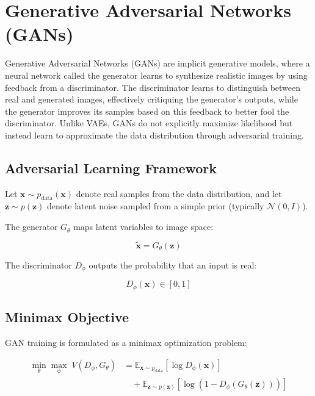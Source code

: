 \section{Generative Adversarial Networks (GANs)}
\label{sec:gan_theory}

Generative Adversarial Networks (GANs) \cite{goodfellow2014generativeadversarialnetworks} are 
implicit generative models, where a neural network called the generator learns to synthesize 
realistic images by using feedback from a discriminator. The discriminator learns to distinguish 
between real and generated images, effectively critiquing the generator’s outputs, while the 
generator improves its samples based on this feedback to better fool the discriminator. Unlike 
VAEs, GANs do not explicitly maximize likelihood but instead learn to approximate the data 
distribution through adversarial training.

\subsection{Adversarial Learning Framework}

Let $\mathbf{x} \sim p_{\text{data}}(\mathbf{x})$ denote real samples from the data distribution, and let $\mathbf{z} \sim p(\mathbf{z})$ denote latent noise sampled from a simple prior (typically $\mathcal{N}(0, I)$).

The generator $G_\theta$ maps latent variables to image space:

\begin{equation}
\tilde{\mathbf{x}} = G_\theta(\mathbf{z})
\end{equation}

The discriminator $D_\phi$ outputs the probability that an input is real:

\begin{equation}
D_\phi(\mathbf{x}) \in [0,1]
\end{equation}

\subsection{Minimax Objective}

GAN training is formulated as a minimax optimization problem:

\begin{align}
\min_\theta \max_\phi \; V(D_\phi, G_\theta)
&=
\mathbb{E}_{\mathbf{x} \sim p_{\text{data}}}
\left[
\log D_\phi(\mathbf{x})
\right]
\\
&\quad +
\mathbb{E}_{\mathbf{z} \sim p(\mathbf{z})}
\left[
\log \left(1 - D_\phi(G_\theta(\mathbf{z}))\right)
\right]
\end{align}

